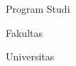 \begin{titlepage}
\centering
\vspace*{1cm}

{\Huge\bfseries \ThesisTitle\par}

\vspace{2cm}

{\Large \AuthorName\par}
{\large \AuthorNIM\par}

\vfill

{\large Program Studi\par}
{\large Fakultas\par}
{\large Universitas\par}

\vspace{1cm}

{\large \GraduationYear\par}

\end{titlepage}